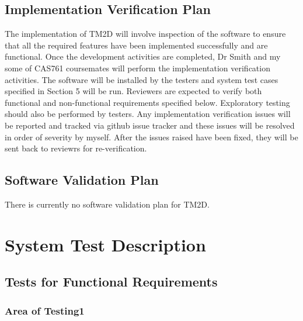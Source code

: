 \documentclass[12pt, titlepage]{article}
\begin{document}
\subsection{Implementation Verification Plan}
 The implementation of TM2D will involve inspection of the software to ensure that all the required features have been implemented successfully and are functional. Once the development activities are completed, Dr Smith and my some of CAS761 coursemates will perform the implementation verification activities. The software will be installed by the testers and system test cases specified in Section 5 will be run. Reviewers are expected to verify both functional and non-functional requirements specified below. Exploratory testing should also be performed by testers.
 Any implementation verification issues will be reported and tracked via github issue tracker and these issues will be resolved in order of severity by myself. After the issues raised have been fixed, they will be sent back to reviewrs for re-verification.

\subsection{Software Validation Plan}

	There is currently no software validation plan for TM2D.

\section{System Test Description}
	
\subsection{Tests for Functional Requirements}


\subsubsection{Area of Testing1}
		
\end{document}
